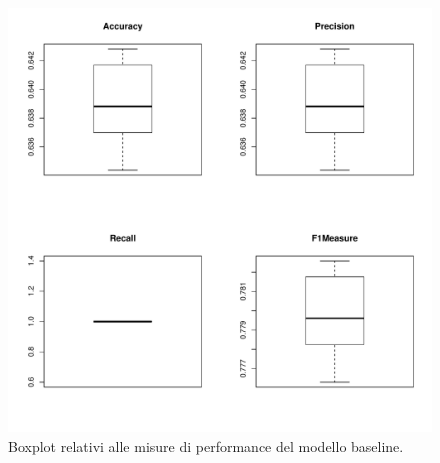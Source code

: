 \begin{figure}
	\centering
	\includegraphics[width=0.7\linewidth]{../FinalResults/Baseline_performance}
	\caption{Boxplot relativi alle misure di performance del modello baseline.}
	\label{fig:baselineperformance}
\end{figure}


